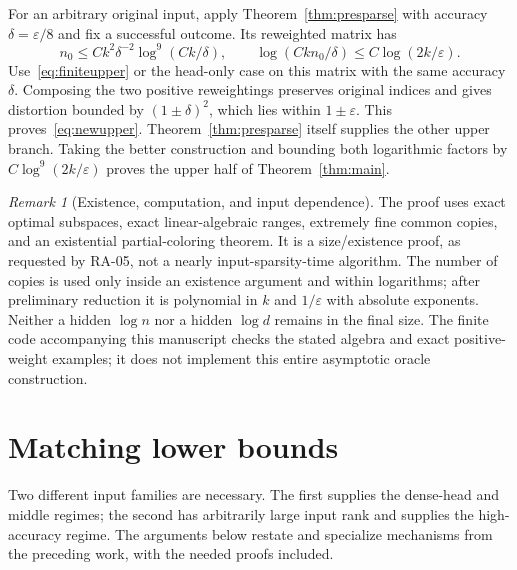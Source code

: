 \documentclass[11pt]{article}
\theoremstyle{remark}\newtheorem{remark}[theorem]{Remark}
\numberwithin{equation}{section}
\begin{document}
For an arbitrary original input, apply Theorem~\ref{thm:presparse} with accuracy $\delta=\varepsilon/8$ and fix a successful outcome. Its reweighted matrix has
\[
 n_0\le Ck^2\delta^{-2}\log^9(Ck/\delta),
 \qquad \log(Ckn_0/\delta)\le C\log(2k/\varepsilon).
\]
Use~\eqref{eq:finiteupper} or the head-only case on this matrix with the same accuracy $\delta$. Composing the two positive reweightings preserves original indices and gives distortion bounded by
$(1\pm\delta)^2$, which lies within $1\pm\varepsilon$. This proves~\eqref{eq:newupper}. Theorem~\ref{thm:presparse} itself supplies the other upper branch. Taking the better construction and bounding both logarithmic factors by $C\log^9(2k/\varepsilon)$ proves the upper half of Theorem~\ref{thm:main}.

\begin{remark}[Existence, computation, and input dependence]
The proof uses exact optimal subspaces, exact linear-algebraic ranges, extremely fine common copies, and an existential partial-coloring theorem. It is a size/existence proof, as requested by RA-05, not a nearly input-sparsity-time algorithm. The number of copies is used only inside an existence argument and within logarithms; after preliminary reduction it is polynomial in $k$ and $1/\varepsilon$ with absolute exponents. Neither a hidden $\log n$ nor a hidden $\log d$ remains in the final size. The finite code accompanying this manuscript checks the stated algebra and exact positive-weight examples; it does not implement this entire asymptotic oracle construction.
\end{remark}
\section{Matching lower bounds}\label{sec:lower}
Two different input families are necessary. The first supplies the dense-head and middle regimes; the second has arbitrarily large input rank and supplies the high-accuracy regime. The arguments below restate and specialize mechanisms from the preceding work, with the needed proofs included.
\end{document}
